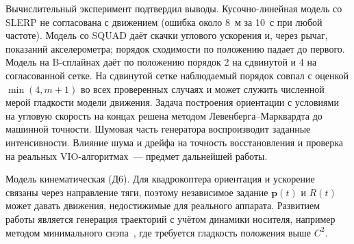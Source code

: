 \documentclass{misisarticle}
\newcommand{\vb}[1]{\mathbf{#1}}
\begin{document}
Вычислительный эксперимент подтвердил выводы. Кусочно-линейная модель со SLERP не согласована с движением (ошибка около 8~м за 10~с при любой частоте). Модель со SQUAD даёт скачки углового ускорения и, через рычаг, показаний акселерометра; порядок сходимости по положению падает до первого. Модель на B-сплайнах даёт по положению порядок 2 на сдвинутой и 4 на согласованной сетке. На сдвинутой сетке наблюдаемый порядок совпал с оценкой $\min(4,m+1)$ во всех проверенных случаях и может служить численной мерой гладкости модели движения. Задача построения ориентации с условиями на угловую скорость на концах решена методом Левенберга--Марквардта до машинной точности. Шумовая часть генератора воспроизводит заданные интенсивности. Влияние шума и дрейфа на точность восстановления и проверка на реальных VIO-алгоритмах~--- предмет дальнейшей работы.

Модель кинематическая (Д6). Для квадрокоптера ориентация и ускорение связаны через направление тяги, поэтому независимое задание $\vb p(t)$ и $R(t)$ может давать движения, недостижимые для реального аппарата. Развитием работы является генерация траекторий с учётом динамики носителя, например методом минимального снэпа~\cite{mellinger}, где требуется гладкость положения выше $C^2$.
\end{document}
